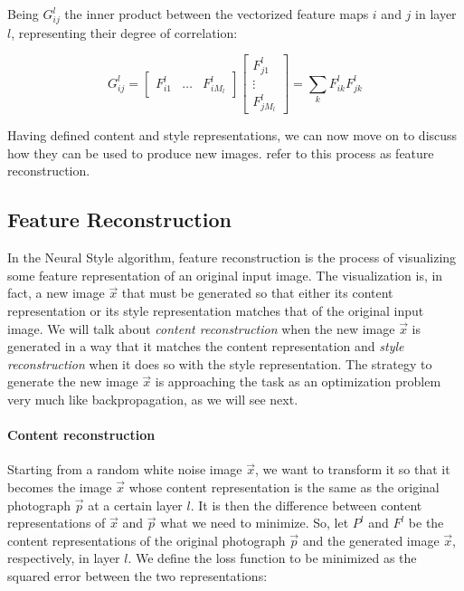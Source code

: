 Being $G^l_{ij}$ the inner product between the vectorized feature maps $i$ and $j$ in layer $l$, representing their degree of correlation:

\begin{equation}
  G^l_{ij} =
  \begin{bmatrix}
    F^l_{i1} & \dots & F^l_{iM_l}
  \end{bmatrix}
  \begin{bmatrix}
    F^l_{j1} \\
    \vdots \\
    F^l_{jM_l}
  \end{bmatrix}
  = \sum_k F^l_{ik}F^l_{jk}
\end{equation}

Having defined content and style representations, we can now move on to discuss how they can be used to produce new images.
\citeauthor{Gatys2015B} refer to this process as feature reconstruction.


\subsection{Feature Reconstruction}
\label{sub:system:method:reconstructions}

In the Neural Style algorithm, feature reconstruction is the process of visualizing some feature representation of an original input image.
The visualization is, in fact, a new image $\vec{x}$ that must be generated so that either its content representation or its style representation matches that of the original input image.
We will talk about \emph{content reconstruction} when the new image $\vec{x}$ is generated in a way that it matches the content representation and \emph{style reconstruction} when it does so with the style representation.
The strategy to generate the new image $\vec{x}$ is approaching the task as an optimization problem very much like backpropagation, as we will see next.

\paragraph{Content reconstruction}
Starting from a random white noise image $\vec{x}$, we want to transform it so that it becomes the image $\vec{x}$ whose content representation is the same as the original photograph $\vec{p}$ at a certain layer $l$.
It is then the difference between content representations of $\vec{x}$ and $\vec{p}$ what we need to minimize.
So, let $P^l$ and $F^l$ be the content representations of the original photograph $\vec{p}$ and the generated image $\vec{x}$, respectively, in layer $l$.
We define the loss function to be minimized as the squared error between the two representations:

